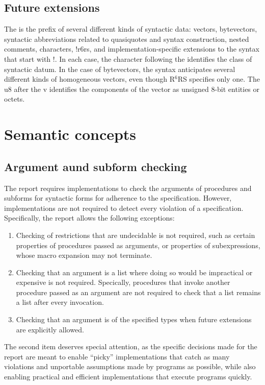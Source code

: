 \documentclass[twoside,twocolumn]{algol60}
\newcommand{\rn}[1]{R$^{#1}$RS}
\begin{document}
\section{Future extensions}

The {\cf\sharpsign} is the prefix of several different kinds of
syntactic data: vectors, bytevectors, syntactic abbreviations related
to quasiquotes and syntax construction, nested comments, characters,
{\cf\sharpsign!r6rs}, and implementation-specific extensions to the
syntax that start with {\cf\sharpsign!}.  In each case, the character
following the {\cf\sharpsign} identifies the class of syntactic datum.
In the case of bytevectors, the syntax anticipates several different
kinds of homogeneous vectors, even though \rn{6} specifies only
one. The {\cf u8} after the {\cf\sharpsign{}v} identifies the
components of the vector as unsigned 8-bit entities or octets.


\chapter{Semantic concepts}

\section{Argument aund subform checking}
\label{argumentchecking}

The report requires implementations to check the arguments of
procedures and subforms for syntactic forms for adherence to the
specification.  However, implementations are not required to detect
every violation of a specification.  Specifically, the report allows
the following exceptions:
%
\begin{enumerate}
\item Checking of restrictions that are undecidable is not required,
  such as certain properties of procedures passed as arguments, or
  properties of subexpressions, whose macro expansion may not
  terminate.
\item Checking that an argument is a list where doing so would be
  impractical or expensive is not required.  Specically, procedures that
  invoke another procedure passed as an argument are not required to
  check that a list remains a list after every invocation.
\item Checking that an argument is of the specified types when future
  extensions are explicitly allowed.
\end{enumerate}
%
The second item deserves special attention, as the specific decisions
made for the report are meant to enable ``picky'' implementations that
catch as many violations and unportable assumptions made by programs
as possible, while also enabling practical and efficient
implementations that execute programs quickly.
\end{document}
